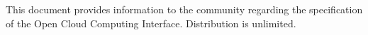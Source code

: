 This document provides information to the community regarding the
specification of the Open Cloud Computing Interface. Distribution is
unlimited.
